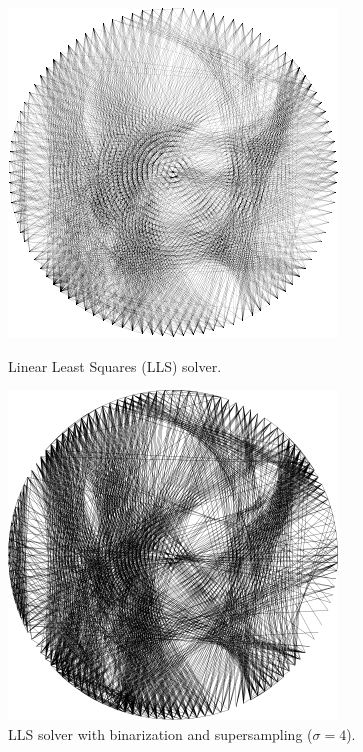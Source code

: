 \begin{figure}[!htb]
\begin{minipage}{0.32\linewidth}
        \includegraphics[width=\linewidth]{images/ls_binary/lls.png}
        \caption{Linear Least Squares (LLS) solver.}
        \label{fig:lls}
    \end{minipage}
    \hfill
    \begin{minipage}{0.32\linewidth}
        \centering
        \includegraphics[width=\linewidth]{images/ls_binary/lls_binary.png}
        \caption{LLS solver with binarization and supersampling (\(\sigma=4\)).}
        \label{fig:lls_binary}
    \end{minipage}
\end{figure}

